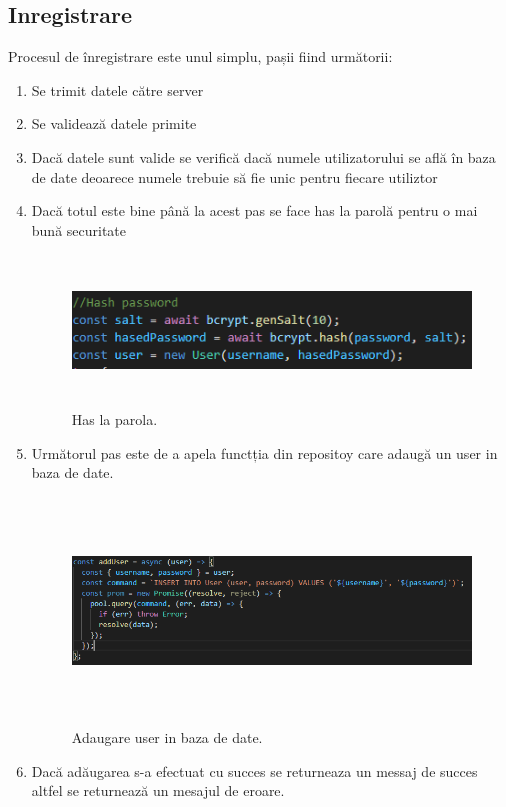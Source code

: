 \subsection{Inregistrare}
\par Procesul de înregistrare este unul simplu, pașii fiind următorii:
\begin{enumerate}
  \item Se trimit datele către server
	\item Se validează datele primite
\item Dacă datele sunt valide se verifică dacă numele utilizatorului se află în baza de date deoarece numele trebuie să fie unic pentru fiecare utiliztor
\item Dacă totul este bine până la acest pas se face has la parolă pentru o mai bună securitate
		\begin{figure}[htbp]
			\centerline{\includegraphics[width=15cm, height=4cm]{figures/hasparola.png}}
			\caption{Has la parola.}
			\label{fig}
		\end{figure}
	\item Următorul pas este de a apela functția din repositoy care adaugă un user in baza de date.
		\begin{figure}[htbp]
			\centerline{\includegraphics[width=19cm, height=6cm]{figures/adaugare user.png}}
			\caption{Adaugare user in baza de date.}
			\label{fig}
		\end{figure}	
	\item Dacă adăugarea s-a efectuat cu succes se returneaza un messaj de succes altfel se returnează un mesajul de eroare.
\end{enumerate}

